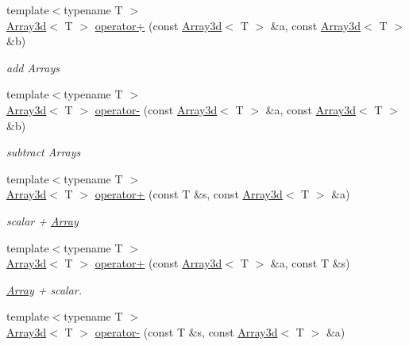 \begin{DoxyCompactItemize}
{\footnotesize template$<$typename T $>$ }\\\mbox{\hyperlink{classXMLArray_1_1Array3d}{Array3d}}$<$ T $>$ \mbox{\hyperlink{namespaceXMLArray_a63ffde7a3ab533938f603805d5b517e8}{operator+}} (const \mbox{\hyperlink{classXMLArray_1_1Array3d}{Array3d}}$<$ T $>$ \&a, const \mbox{\hyperlink{classXMLArray_1_1Array3d}{Array3d}}$<$ T $>$ \&b)
\begin{DoxyCompactList}\small\item\em add Arrays \end{DoxyCompactList}\item 
{\footnotesize template$<$typename T $>$ }\\\mbox{\hyperlink{classXMLArray_1_1Array3d}{Array3d}}$<$ T $>$ \mbox{\hyperlink{namespaceXMLArray_a84aa6790ab54770ccc98e82864af7d7b}{operator-\/}} (const \mbox{\hyperlink{classXMLArray_1_1Array3d}{Array3d}}$<$ T $>$ \&a, const \mbox{\hyperlink{classXMLArray_1_1Array3d}{Array3d}}$<$ T $>$ \&b)
\begin{DoxyCompactList}\small\item\em subtract Arrays \end{DoxyCompactList}\item 
{\footnotesize template$<$typename T $>$ }\\\mbox{\hyperlink{classXMLArray_1_1Array3d}{Array3d}}$<$ T $>$ \mbox{\hyperlink{namespaceXMLArray_a38e9584aa25b1b93bbdeda1cc0d680c6}{operator+}} (const T \&s, const \mbox{\hyperlink{classXMLArray_1_1Array3d}{Array3d}}$<$ T $>$ \&a)
\begin{DoxyCompactList}\small\item\em scalar + \mbox{\hyperlink{classXMLArray_1_1Array}{Array}} \end{DoxyCompactList}\item 
{\footnotesize template$<$typename T $>$ }\\\mbox{\hyperlink{classXMLArray_1_1Array3d}{Array3d}}$<$ T $>$ \mbox{\hyperlink{namespaceXMLArray_ab4d92c674c66f7fcce8e97c5c9a2a665}{operator+}} (const \mbox{\hyperlink{classXMLArray_1_1Array3d}{Array3d}}$<$ T $>$ \&a, const T \&s)
\begin{DoxyCompactList}\small\item\em \mbox{\hyperlink{classXMLArray_1_1Array}{Array}} + scalar. \end{DoxyCompactList}\item 
{\footnotesize template$<$typename T $>$ }\\\mbox{\hyperlink{classXMLArray_1_1Array3d}{Array3d}}$<$ T $>$ \mbox{\hyperlink{namespaceXMLArray_afa891f2c8719af6106397c0e160656a3}{operator-\/}} (const T \&s, const \mbox{\hyperlink{classXMLArray_1_1Array3d}{Array3d}}$<$ T $>$ \&a)

\end{DoxyCompactItemize}
